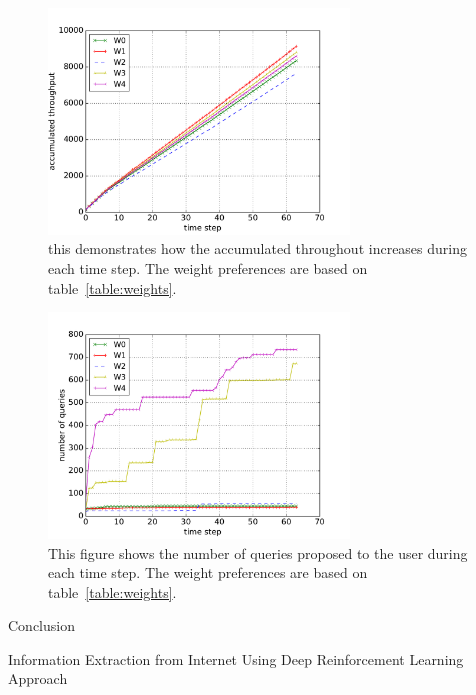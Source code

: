 \documentclass{beamer}
\begin{document}
\begin{frame}

\begin{figure}[t]
\includegraphics[width=8cm]{iimas/trough_step_all++.pdf}
\caption{this demonstrates how the accumulated throughout increases during each time step. The weight preferences are based on table~\ref{table:weights}.}
\centering
\label{fig:trput-vs-timestep}
\end{figure}
\end{frame}
\begin{frame}
\begin{figure}[t]
\includegraphics[width=8cm]{iimas/time-queries-all++.pdf}
\caption{This figure shows the number of queries proposed to the user during each time step. The weight preferences are based on table~\ref{table:weights}.}
\centering
\label{fig:queries-vs-timestep}
\end{figure}
\end{frame}
\begin{frame}{Conclusion}

\end{frame}

\begin{frame}
	\begin{center}
	Information Extraction from Internet Using Deep Reinforcement Learning Approach
	\end{center}
\end{frame}
\end{document}
